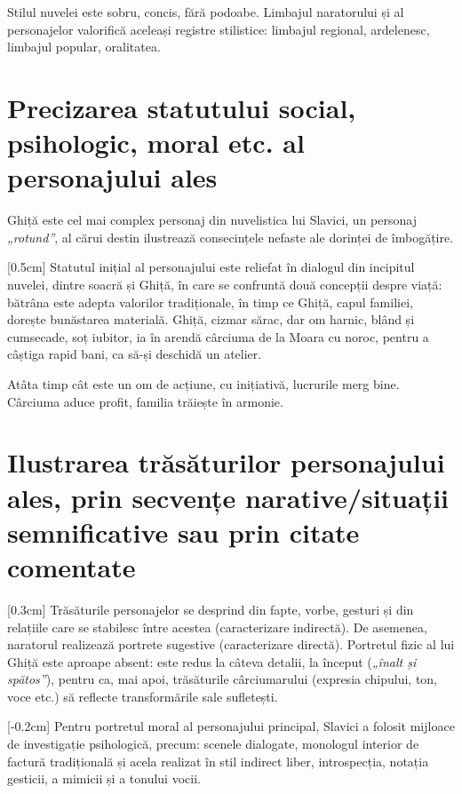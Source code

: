 Stilul nuvelei este sobru, concis, fără podoabe. Limbajul naratorului și al personajelor valorifică aceleași registre stilistice: limbajul regional, ardelenesc, limbajul popular, oralitatea.


\section{Precizarea statutului social, psihologic, moral etc. al personajului ales}

Ghiță este cel mai complex personaj din nuvelistica lui Slavici, un personaj \textit{„rotund”}, al cărui destin ilustrează consecințele nefaste ale dorinței de îmbogățire.

[0.5cm]
Statutul inițial al personajului este reliefat în dialogul din incipitul nuvelei, dintre soacră și Ghiță, în care se confruntă două concepții despre viață: bătrâna este adepta valorilor tradiționale, în timp ce Ghiță, capul familiei, dorește bunăstarea materială. Ghiță, cizmar sărac, dar om harnic, blând și cumsecade, soț iubitor, ia în arendă cârciuma de la Moara cu noroc, pentru a câștiga rapid bani, ca să-și deschidă un atelier.

Atâta timp cât este un om de acțiune, cu inițiativă, lucrurile merg bine. Cârciuma aduce profit, familia trăiește în armonie.


\section{Ilustrarea trăsăturilor personajului ales, prin secvențe narative/situații semnificative sau prin citate comentate}

[0.3cm]
Trăsăturile personajelor se desprind din fapte, vorbe, gesturi și din relațiile care se stabilesc între acestea (caracterizare indirectă). De asemenea, naratorul realizează portrete sugestive (caracterizare directă). Portretul fizic al lui Ghiță este aproape absent: este redus la câteva detalii, la început (\textit{„înalt și spătos”}), pentru ca, mai apoi, trăsăturile cârciumarului (expresia chipului, ton, voce etc.) să reflecte transformările sale sufletești.

[-0.2cm]
Pentru portretul moral al personajului principal, Slavici a folosit mijloace de investigație psihologică, precum: scenele dialogate, monologul interior de factură tradițională și acela realizat în stil indirect liber, introspecția, notația gesticii, a mimicii și a tonului vocii.


